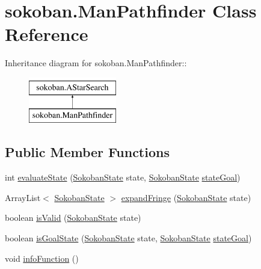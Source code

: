 \hypertarget{classsokoban_1_1ManPathfinder}{
\section{sokoban.ManPathfinder Class Reference}
\label{classsokoban_1_1ManPathfinder}
}
Inheritance diagram for sokoban.ManPathfinder::\begin{figure}[H]
\begin{center}
\leavevmode
\includegraphics[height=2cm]{classsokoban_1_1ManPathfinder}
\end{center}
\end{figure}
\subsection*{Public Member Functions}
\begin{CompactItemize}
\item 
int \hyperlink{classsokoban_1_1ManPathfinder_62decfb98167d1f63ea33408c5130e00}{evaluateState} (\hyperlink{classsokoban_1_1SokobanState}{SokobanState} state, \hyperlink{classsokoban_1_1SokobanState}{SokobanState} \hyperlink{classsokoban_1_1AStarSearch_b79570b0700c83ab7f3ef553923b5c00}{stateGoal})
\item 
ArrayList$<$ \hyperlink{classsokoban_1_1SokobanState}{SokobanState} $>$ \hyperlink{classsokoban_1_1ManPathfinder_096cfcfa1b5506db10dc160810ffca49}{expandFringe} (\hyperlink{classsokoban_1_1SokobanState}{SokobanState} state)
\item 
boolean \hyperlink{classsokoban_1_1ManPathfinder_b32f8b3f28f89843bf9942f50faed667}{isValid} (\hyperlink{classsokoban_1_1SokobanState}{SokobanState} state)
\item 
boolean \hyperlink{classsokoban_1_1ManPathfinder_279eb3ffae4e5ca01fba414916fa9f40}{isGoalState} (\hyperlink{classsokoban_1_1SokobanState}{SokobanState} state, \hyperlink{classsokoban_1_1SokobanState}{SokobanState} \hyperlink{classsokoban_1_1AStarSearch_b79570b0700c83ab7f3ef553923b5c00}{stateGoal})
\item 
void \hyperlink{classsokoban_1_1ManPathfinder_d1511ea4db735c0143acfd91352014d8}{infoFunction} ()
\end{CompactItemize}


